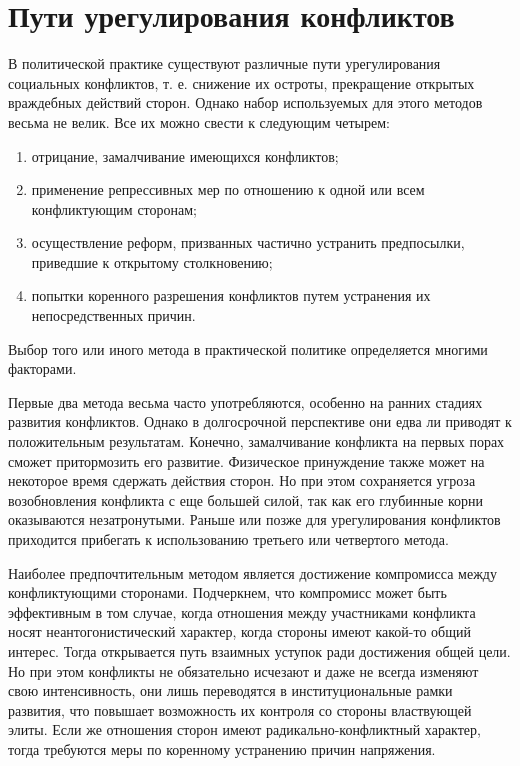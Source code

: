\pagebreak %

\chapter{Пути урегулирования конфликтов}

В политической практике существуют различные пути урегулирования социальных
конфликтов, т. е. снижение их остроты, прекращение открытых враждебных действий
сторон. Однако набор используемых для этого методов весьма не велик. Все их
можно свести к следующим четырем:
\begin{enumerate}
    \item отрицание, замалчивание имеющихся конфликтов;
    \item применение репрессивных мер по отношению к одной или всем
    конфликтующим сторонам;
    \item осуществление реформ, призванных частично устранить предпосылки,
    приведшие к открытому столкновению;
    \item попытки коренного разрешения конфликтов путем устранения их
    непосредственных причин.
\end{enumerate}

Выбор того или иного метода в практической политике определяется многими
факторами.

Первые два метода весьма часто употребляются, особенно на ранних стадиях
развития конфликтов. Однако в долгосрочной перспективе они едва ли приводят к
положительным результатам. Конечно, замалчивание конфликта на первых порах
сможет притормозить его развитие. Физическое принуждение также может на
некоторое время сдержать действия сторон. Но при этом сохраняется угроза
возобновления конфликта с еще большей силой, так как его глубинные корни
оказываются незатронутыми. Раньше или позже для урегулирования конфликтов
приходится прибегать к использованию третьего или четвертого метода.

Наиболее предпочтительным методом является достижение компромисса между
конфликтующими сторонами. Подчеркнем, что компромисс может быть эффективным в
том случае, когда отношения между участниками конфликта носят
неантогонистический характер, когда стороны имеют какой-то общий интерес. Тогда
открывается путь взаимных уступок ради достижения общей цели. Но при этом
конфликты не обязательно исчезают и даже не всегда изменяют свою интенсивность,
они лишь переводятся в институциональные рамки развития, что повышает
возможность их контроля со стороны властвующей элиты. Если же отношения сторон
имеют радикально-конфликтный характер, тогда требуются меры по коренному
устранению причин напряжения.

